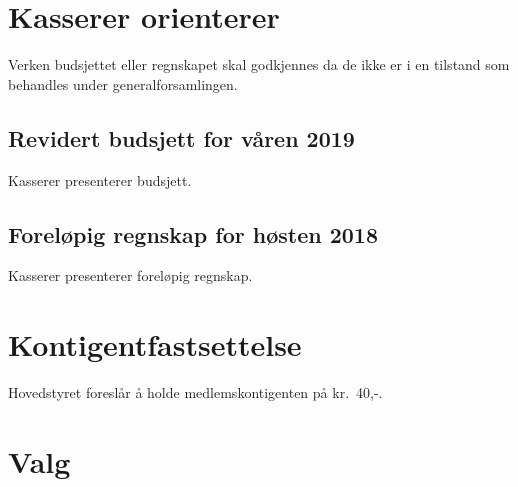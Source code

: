 \documentclass[10pt,norsk,a4paper]{article}
\begin{document}
\newpage

\section{Kasserer orienterer}
Verken budsjettet eller regnskapet skal godkjennes da
de ikke er i en tilstand som behandles under generalforsamlingen.

\subsection{Revidert budsjett for våren 2019}
Kasserer presenterer budsjett.

\subsection{Foreløpig regnskap for høsten 2018}
Kasserer presenterer foreløpig regnskap.

\section{Kontigentfastsettelse}
Hovedstyret foreslår å holde medlemskontigenten på kr.~40,-.

\newpage

\section{Valg}
\end{document}

